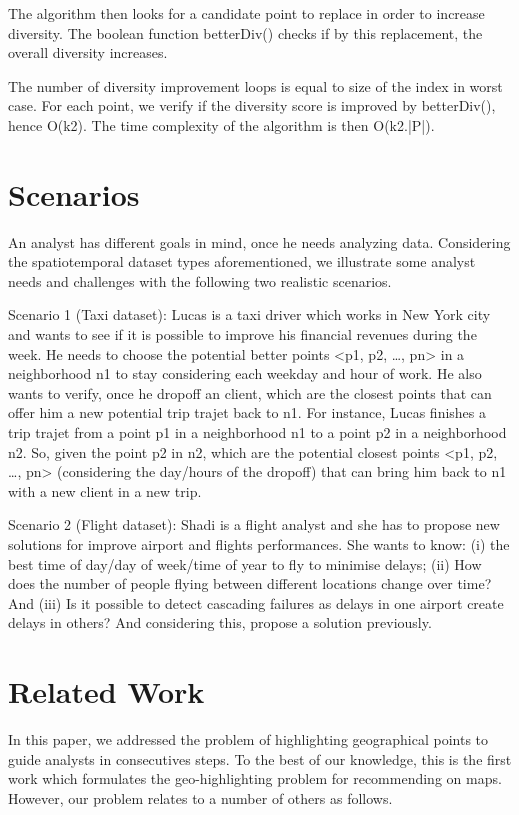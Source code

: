 \documentclass{sig-alternate-05-2015}
\begin{document}
The algorithm then looks for a candidate point to replace in order to increase diversity. The boolean function betterDiv() checks if by this replacement, the overall diversity increases.

The number of diversity improvement loops is equal to size of the index in worst case. For each point, we verify if the diversity score is improved by betterDiv(), hence O(k2). The time complexity of the algorithm is then O(k2.|P|).

\section{Scenarios}

An analyst has different goals in mind, once he needs analyzing data. Considering the spatiotemporal dataset types aforementioned, we illustrate some analyst needs and challenges with the following two realistic scenarios.

Scenario 1 (Taxi dataset): Lucas is a taxi driver which works in New York city and wants to see if it is possible to improve his financial revenues during the week. He needs to choose the potential better points <p1, p2, …, pn> in a neighborhood n1 to stay considering each weekday and hour of work. He also wants to verify, once he dropoff an client, which are the closest points that can offer him a new potential trip trajet back to n1. For instance, Lucas finishes a trip trajet from a point p1 in a neighborhood n1 to a point p2 in a neighborhood n2.  So, given the point p2 in n2, which are the potential closest points <p1, p2, …, pn> (considering the day/hours of the dropoff) that can bring him back to n1 with a new client in a new trip.    

Scenario 2 (Flight dataset): Shadi is a flight analyst and she has to propose new solutions for improve airport and flights performances. She wants to know: (i) the best time of day/day of week/time of year to fly to minimise delays; (ii) How does the number of people flying between different locations change over time? And (iii) Is it possible to detect cascading failures as delays in one airport create delays in others? And considering this, propose a solution previously. 

\section{Related Work}

In this paper, we addressed the problem of highlighting geographical points to guide analysts in consecutives steps. To the best of our knowledge, this is the first work which formulates the geo-highlighting problem for recommending on maps. However, our problem relates to a number of others as follows.
\end{document}

